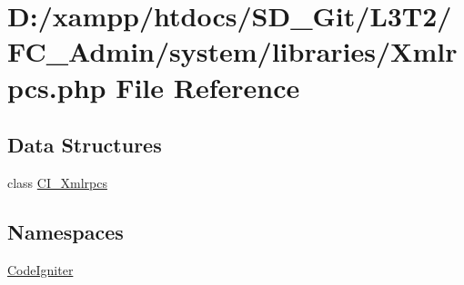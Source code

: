 \hypertarget{_admin_2system_2libraries_2_xmlrpcs_8php}{}\section{D\+:/xampp/htdocs/\+S\+D\+\_\+\+Git/\+L3\+T2/\+F\+C\+\_\+\+Admin/system/libraries/\+Xmlrpcs.php File Reference}
\label{_admin_2system_2libraries_2_xmlrpcs_8php}
\subsection*{Data Structures}
\begin{DoxyCompactItemize}
\item 
class \hyperlink{class_c_i___xmlrpcs}{C\+I\+\_\+\+Xmlrpcs}
\end{DoxyCompactItemize}
\subsection*{Namespaces}
\begin{DoxyCompactItemize}
\item 
 \hyperlink{namespace_code_igniter}{Code\+Igniter}
\end{DoxyCompactItemize}
